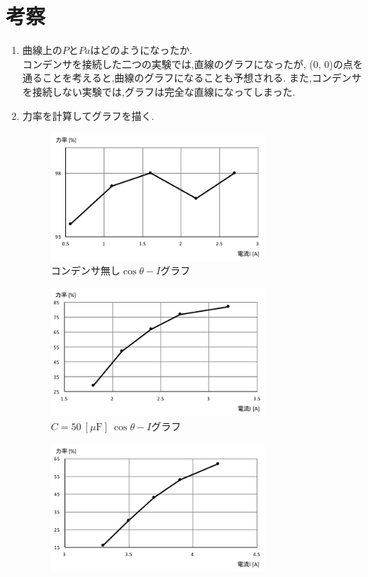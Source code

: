 \documentclass[uplatex]{jsarticle}
\begin{document}
    \section{考察}
        \begin{enumerate}
            \item 曲線上の$P$と$Pa$はどのようになったか. \\
                コンデンサを接続した二つの実験では,直線のグラフになったが, (0, 0)の点を通ることを考えると,曲線のグラフになることも予想される.
                また,コンデンサを接続しない実験では,グラフは完全な直線になってしまった.
            \item 力率を計算してグラフを描く.
                \begin{figure}[h]
                    \centering
                    \includegraphics[width = 8cm]{gurahu3.pdf}
                    \caption{コンデンサ無し$\cos \theta -I$グラフ}
                \end{figure}
                \begin{figure}[h]
                    \centering
                    \includegraphics[width = 8cm]{gurahu6.pdf}
                    \caption{$C = 50 \ [\mu \mathrm F] \ \cos \theta -I$グラフ}
                \end{figure}
                \begin{figure}[h]
                    \centering
                    \includegraphics[width = 8cm]{gurahu9.pdf}

\end{figure}
\end{enumerate}
\end{document}
